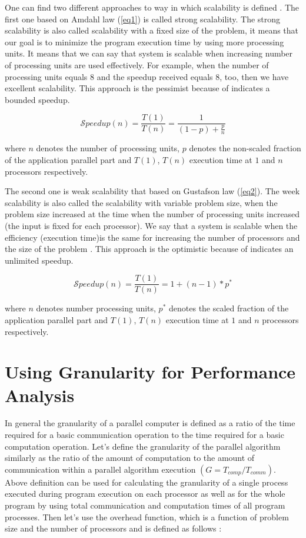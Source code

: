 \documentclass[runningheads]{llncs}
\begin{document}
One can find two different approaches to way in which scalability is defined \cite{shoukourian}. The first one based on Amdahl law (\ref{eq1}) is called strong scalability. The strong scalability is also called scalability with a fixed size of the problem, it means that our goal is to minimize the program execution time by using more processing units. It means that we can say that system is scalable when increasing number of processing units are used effectively. For example, when the number of processing units equals 8 and the speedup received equals 8, too, then we have excellent scalability. This approach is the pessimist because of indicates a bounded speedup. 

\begin{equation}
\label{eq1} 
\mathcal Speedup(n) = \frac{T(1)}{T(n)} =
\frac{1}{(1-p) + \frac{p}{n}} 
\end{equation}

\noindent where $n$ denotes the number of processing units, $p$ denotes the non-scaled fraction of the application parallel part and $T(1)$, $T(n)$ execution time at $1$ and $n$ processors respectively. 

The second one is weak scalability that based on Gustafson law  (\ref{eq2}). The week scalability is also called the scalability with variable problem size, when the problem size increased at the time when the number of processing units increased (the input is fixed for each processor). We say that a system is scalable when the efficiency (execution time)is the same for increasing the number of processors and the size of the problem \cite{grama}. This approach is the optimistic because of indicates an unlimited speedup.

\begin{equation}
\label{eq2} 
\mathcal Speedup(n) = \frac{T(1)}{T(n)} =
1 + (n-1)*p^*
\end{equation}

\noindent where $n$ denotes number processing units, $p^*$ denotes the scaled fraction of the application parallel part and $T(1)$, $T(n)$ execution time at $1$ and $n$ processors respectively. 

\section{Using Granularity for Performance Analysis}

In general the granularity of a parallel computer is defined as a ratio of the time required for a basic communication operation to the time required for a basic computation operation. Let's define the granularity of the parallel algorithm similarly as the ratio of the amount of computation to the amount of communication within a parallel algorithm execution $(G=T_{comp}/T_{comm})$. Above definition can be used for calculating the granularity of a single process executed during program execution on each processor as well as
for the whole program by using total communication and computation times of all program processes. 
Then let's use the overhead function, which is a function of problem size and the number
of processors and is defined as follows \cite{grama}:
\end{document}
